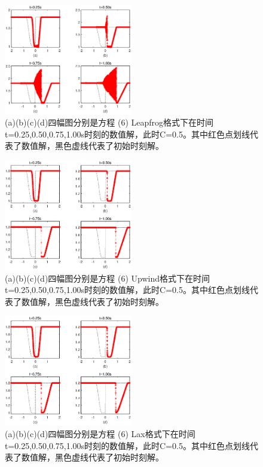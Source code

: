 \documentclass{article}
\begin{document}
\begin{figure}[H]
    \centering
    \includegraphics[width=0.5\textwidth]{Leapfrog.eps}
    \caption{(a)(b)(c)(d)四幅图分别是方程 (6)  Leapfrog格式下在时间t=0.25,0.50,0.75,1.00s时刻的数值解，此时C=0.5。其中红色点划线代表了数值解，黑色虚线代表了初始时刻解。}
    \label{fig:leapfrog2}
\end{figure}
\begin{figure}[H]
    \centering
    \includegraphics[width=0.5\textwidth]{Upwind.eps}
    \caption{(a)(b)(c)(d)四幅图分别是方程 (6) Upwind格式下在时间t=0.25,0.50,0.75,1.00s时刻的数值解，此时C=0.5。其中红色点划线代表了数值解，黑色虚线代表了初始时刻解。}
    \label{fig:upwind2}
\end{figure}
\begin{figure}[H]
    \centering
    \includegraphics[width=0.5\textwidth]{Lax.eps}
    \caption{(a)(b)(c)(d)四幅图分别是方程 (6) Lax格式下在时间t=0.25,0.50,0.75,1.00s时刻的数值解，此时C=0.5。其中红色点划线代表了数值解，黑色虚线代表了初始时刻解。}
    \label{fig:lax2}
\end{figure}
\end{document}
